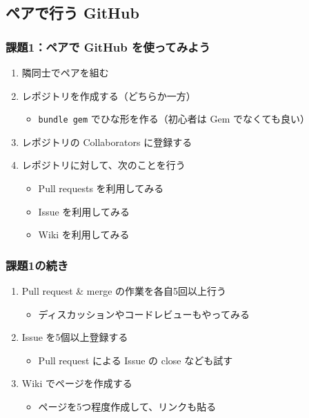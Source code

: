 \documentclass[a4paper,twoside,twocolumn]{bxjsarticle}
\begin{document}
\subsection{ペアで行う GitHub}
\label{sec-2-1}
\subsubsection{課題1：ペアで GitHub を使ってみよう}
\label{sec-2-1-1}
\begin{enumerate}
\item 隣同士でペアを組む
\item レポジトリを作成する（どちらか一方）
\begin{itemize}
\item \texttt{bundle gem} でひな形を作る（初心者は Gem でなくても良い）
\end{itemize}
\item レポジトリの Collaborators に登録する
\item レポジトリに対して、次のことを行う
\begin{itemize}
\item Pull requests を利用してみる
\item Issue を利用してみる
\item Wiki を利用してみる
\end{itemize}
\end{enumerate}

\subsubsection{課題1の続き}
\label{sec-2-1-2}
\begin{enumerate}
\item Pull request \& merge の作業を各自5回以上行う
\begin{itemize}
\item ディスカッションやコードレビューもやってみる
\end{itemize}
\item Issue を5個以上登録する
\begin{itemize}
\item Pull request による Issue の close なども試す
\end{itemize}
\item Wiki でページを作成する
\begin{itemize}
\item ページを5つ程度作成して、リンクも貼る
\end{itemize}
\end{enumerate}
\end{document}
